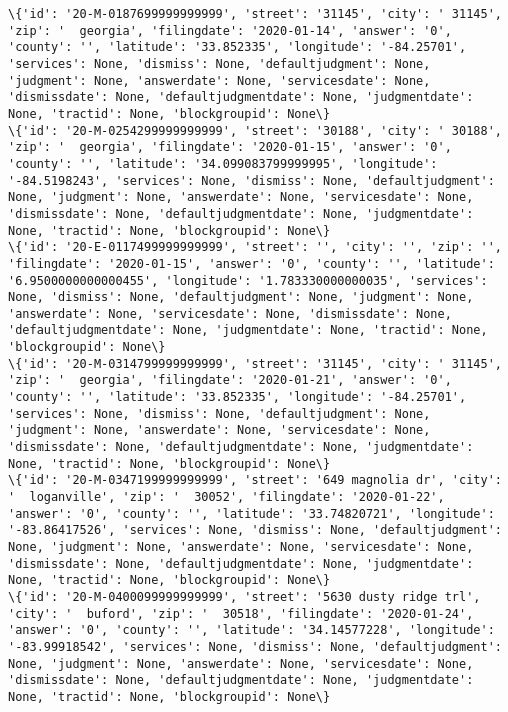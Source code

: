 \documentclass[11pt]{article}
\begin{document}
\begin{Verbatim}[commandchars=\\\{\}]
\{'id': '20-M-0187699999999999', 'street': '31145', 'city': ' 31145', 'zip': '  georgia', 'filingdate': '2020-01-14', 'answer': '0', 'county': '', 'latitude': '33.852335', 'longitude': '-84.25701', 'services': None, 'dismiss': None, 'defaultjudgment': None, 'judgment': None, 'answerdate': None, 'servicesdate': None, 'dismissdate': None, 'defaultjudgmentdate': None, 'judgmentdate': None, 'tractid': None, 'blockgroupid': None\}
\{'id': '20-M-0254299999999999', 'street': '30188', 'city': ' 30188', 'zip': '  georgia', 'filingdate': '2020-01-15', 'answer': '0', 'county': '', 'latitude': '34.099083799999995', 'longitude': '-84.5198243', 'services': None, 'dismiss': None, 'defaultjudgment': None, 'judgment': None, 'answerdate': None, 'servicesdate': None, 'dismissdate': None, 'defaultjudgmentdate': None, 'judgmentdate': None, 'tractid': None, 'blockgroupid': None\}
\{'id': '20-E-0117499999999999', 'street': '', 'city': '', 'zip': '', 'filingdate': '2020-01-15', 'answer': '0', 'county': '', 'latitude': '6.9500000000000455', 'longitude': '1.783330000000035', 'services': None, 'dismiss': None, 'defaultjudgment': None, 'judgment': None, 'answerdate': None, 'servicesdate': None, 'dismissdate': None, 'defaultjudgmentdate': None, 'judgmentdate': None, 'tractid': None, 'blockgroupid': None\}
\{'id': '20-M-0314799999999999', 'street': '31145', 'city': ' 31145', 'zip': '  georgia', 'filingdate': '2020-01-21', 'answer': '0', 'county': '', 'latitude': '33.852335', 'longitude': '-84.25701', 'services': None, 'dismiss': None, 'defaultjudgment': None, 'judgment': None, 'answerdate': None, 'servicesdate': None, 'dismissdate': None, 'defaultjudgmentdate': None, 'judgmentdate': None, 'tractid': None, 'blockgroupid': None\}
\{'id': '20-M-0347199999999999', 'street': '649 magnolia dr', 'city': '  loganville', 'zip': '  30052', 'filingdate': '2020-01-22', 'answer': '0', 'county': '', 'latitude': '33.74820721', 'longitude': '-83.86417526', 'services': None, 'dismiss': None, 'defaultjudgment': None, 'judgment': None, 'answerdate': None, 'servicesdate': None, 'dismissdate': None, 'defaultjudgmentdate': None, 'judgmentdate': None, 'tractid': None, 'blockgroupid': None\}
\{'id': '20-M-0400099999999999', 'street': '5630 dusty ridge trl', 'city': '  buford', 'zip': '  30518', 'filingdate': '2020-01-24', 'answer': '0', 'county': '', 'latitude': '34.14577228', 'longitude': '-83.99918542', 'services': None, 'dismiss': None, 'defaultjudgment': None, 'judgment': None, 'answerdate': None, 'servicesdate': None, 'dismissdate': None, 'defaultjudgmentdate': None, 'judgmentdate': None, 'tractid': None, 'blockgroupid': None\}

\end{Verbatim}
\end{document}
